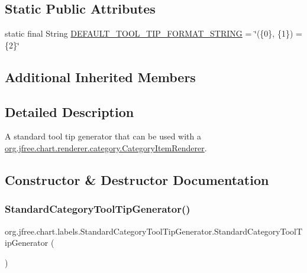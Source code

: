 \subsection*{Static Public Attributes}
\begin{DoxyCompactItemize}
\item 
static final String \mbox{\hyperlink{classorg_1_1jfree_1_1chart_1_1labels_1_1_standard_category_tool_tip_generator_affe87ac1e6d46add86b8d281d84c96a1}{D\+E\+F\+A\+U\+L\+T\+\_\+\+T\+O\+O\+L\+\_\+\+T\+I\+P\+\_\+\+F\+O\+R\+M\+A\+T\+\_\+\+S\+T\+R\+I\+NG}} = \char`\"{}(\{0\}, \{1\}) = \{2\}\char`\"{}
\end{DoxyCompactItemize}
\subsection*{Additional Inherited Members}


\subsection{Detailed Description}
A standard tool tip generator that can be used with a \mbox{\hyperlink{interfaceorg_1_1jfree_1_1chart_1_1renderer_1_1category_1_1_category_item_renderer}{org.\+jfree.\+chart.\+renderer.\+category.\+Category\+Item\+Renderer}}. 

\subsection{Constructor \& Destructor Documentation}
\mbox{\label{classorg_1_1jfree_1_1chart_1_1labels_1_1_standard_category_tool_tip_generator_a2c8cdcfa6f402e94e851ee7a0886b6a6}} 
\subsubsection{\texorpdfstring{Standard\+Category\+Tool\+Tip\+Generator()}{StandardCategoryToolTipGenerator()}\hspace{0.1cm}{\footnotesize\ttfamily [1/3]}}
{\footnotesize\ttfamily org.\+jfree.\+chart.\+labels.\+Standard\+Category\+Tool\+Tip\+Generator.\+Standard\+Category\+Tool\+Tip\+Generator (\begin{DoxyParamCaption}{ }\end{DoxyParamCaption})}

